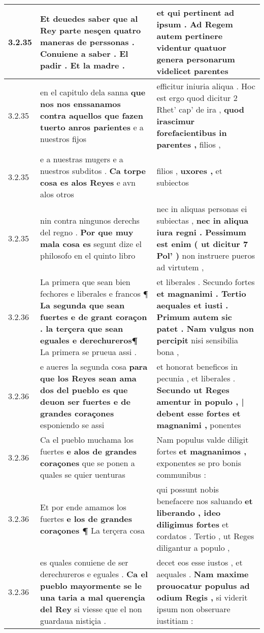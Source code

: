 \begin{tabular}{|p{1cm}|p{6.5cm}|p{6.5cm}|}
3.2.35 & Et deuedes saber \textbf{ que al Rey parte nesçen quatro maneras de perssonas . } Conuiene a saber . El padir . Et la madre . & et qui pertinent ad ipsum . \textbf{ Ad Regem autem pertinere videntur quatuor genera personarum } videlicet parentes \\\hline
3.2.35 & en el capitulo dela sanna \textbf{ que nos nos enssanamos contra aquellos que fazen tuerto anros parientes } e a nuestros fijos & efficitur iniuria aliqua . Hoc est ergo quod dicitur 2 Rhet’ cap’ de ira , \textbf{ quod irascimur forefacientibus in parentes , } filios , \\\hline
3.2.35 & e a nuestras mugers e a nuestros subditos . \textbf{ Ca torpe cosa es alos Reyes } e avn alos otros & filios , \textbf{ uxores , } et subiectos \\\hline
3.2.35 & nin contra ningunos derechs del regno . \textbf{ Por que muy mala cosa es } segunt dize el philosofo en el quinto libro & nec in aliquas personas ei subiectas , \textbf{ nec in aliqua iura regni . Pessimum est enim ( ut dicitur 7 Pol’ ) } non instruere pueros ad virtutem , \\\hline
3.2.36 & La primera que sean bien fechores e liberales e francos ¶ \textbf{ La segunda que sean fuertes e de grant coraçon . la terçera que sean eguales e derechureros¶ } La primera se prueua assi . & et liberales . Secundo fortes \textbf{ et magnanimi . Tertio aequales et iusti . Primum autem sic patet . Nam vulgus non percipit } nisi sensibilia bona , \\\hline
3.2.36 & e aueres la segunda cosa \textbf{ para que los Reyes sean ama dos del pueblo es que deuon ser fuertes e de grandes coraçones } esponiendo se assi & et honorat beneficos in pecunia , et liberales . \textbf{ Secundo ut Reges amentur in populo , | debent esse fortes et magnanimi , } ponentes \\\hline
3.2.36 & Ca el pueblo muchama los fuertes \textbf{ e alos de grandes coraçones } que se ponen a quales se quier uenturas & Nam populus valde diligit fortes \textbf{ et magnanimos , } exponentes se pro bonis communibus : \\\hline
3.2.36 & Et por ende amamos los fuertes \textbf{ e los de grandes coraçones ¶ } La terçera cosa & qui possunt nobis benefacere nos saluando \textbf{ et liberando , ideo diligimus fortes } et cordatos . Tertio , ut Reges diligantur a populo , \\\hline
3.2.36 & es quales conuiene de ser derechureros e eguales . \textbf{ Ca el pueblo mayormente se le una taria a mal querençia del Rey } si viesse que el non guardaua nistiçia . & decet eos esse iustos , et aequales . \textbf{ Nam maxime prouocatur populus ad odium Regis , } si viderit ipsum non obseruare iustitiam : \\\hline

\end{tabular}
